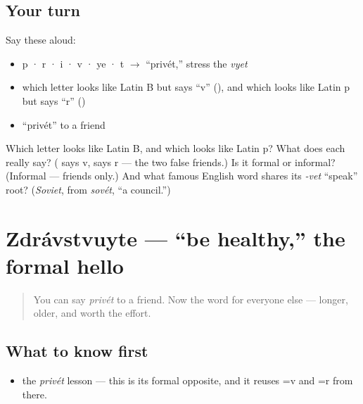 \subsection*{Your turn}
Say these aloud:

\begin{itemize}
\raggedright
  \item p · r · i · v · ye · t $\to$ \textquotedblleft{}privét,\textquotedblright{} stress the \emph{vyet}
  \item which letter looks like Latin B but says \textquotedblleft{}v\textquotedblright{} (), and which looks like Latin p but says \textquotedblleft{}r\textquotedblright{} ()
  \item \textquotedblleft{}privét\textquotedblright{} to a friend
\end{itemize}

\begin{tcolorbox}[breakable,colback=teal!4,colframe=teal!35!black,title={Before you move on}]
Which letter looks like Latin B, and which looks like Latin p? What does each really say? ( says v,  says r — the two false friends.) Is it formal or informal? (Informal — friends only.) And what famous English word shares its \emph{-vet} \textquotedblleft{}speak\textquotedblright{} root? (\emph{Soviet}, from \emph{sovét}, \textquotedblleft{}a council.\textquotedblright{})
\end{tcolorbox}
\section[\texorpdfstring{\ru{здравствуйте} (zdrávstvuyte)}{здравствуйте (zdrávstvuyte)}]{Zdrávstvuyte — \textquotedblleft{}be healthy,\textquotedblright{} the formal hello}

\label{lesson:RU-C01-zdravstvuyte}



\begin{quote}
You can say \emph{privét} to a friend. Now the word for everyone else — longer, older, and worth the effort.
\end{quote}

\subsection*{What to know first}
\begin{itemize}
\raggedright
  \item the \emph{privét} lesson — this is its formal opposite, and it reuses =v and =r from there.
\end{itemize}


